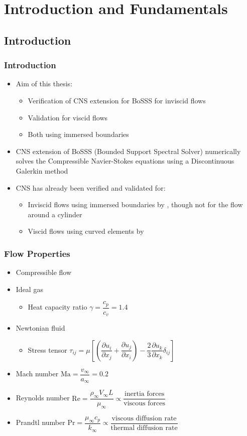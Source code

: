 \section{Introduction and Fundamentals}
\frame{\tableofcontents[currentsection]}
	\subsection{Introduction}
	\begin{frame}
		\frametitle{Introduction}
		\begin{itemize}
			\item Aim of this thesis:
		\begin{itemize}
			\item Verification of CNS extension for BoSSS for inviscid flows
			\item Validation for viscid flows
			\item Both using immersed boundaries
		\end{itemize}
		\pause
		\item CNS extension of BoSSS (Bounded Support Spectral Solver) numerically solves the Compressible Navier-Stokes equations using a Discontinuous Galerkin method
		\pause
		\item CNS has already been verified and validated for:
		\begin{itemize}
			\item Inviscid flows using immersed boundaries by \cite[Müller 2014]{muller2014}, though not for the flow around a cylinder
			\item Viscid flows using curved elements by \cite[Ayers 2015]{ayers2015}
		\end{itemize}
		\end{itemize}
	\end{frame}
	\begin{frame}
		\frametitle{Flow Properties}
		\begin{itemize}
			\item Compressible flow
			\item Ideal gas 
			\begin{itemize}
				\item Heat capacity ratio $\gamma = \dfrac{c_p}{c_v} = 1.4$
			\end{itemize}
			\item Newtonian fluid
			\begin{itemize}
				\item Stress tensor $\tau_{ij} = \mu \left[\left(\dfrac{\partial u_i}{\partial x_j} + \dfrac{\partial u_j}{\partial x_i}\right)- \dfrac{2}{3}\dfrac{\partial u_k}{\partial x_k} \delta_{ij}\right]$
			\end{itemize}
			\item Mach number $\text{Ma} = \dfrac{v_\infty}{a_\infty} = 0.2$
			\item Reynolds number $\text{Re} = \dfrac{\rho_\infty V_\infty L}{\mu_\infty} \propto \dfrac{\text{inertia forces}}{\text{viscous forces}}$
			\item Prandtl number $\text{Pr} = \dfrac{ \mu_\infty c_p}{k_\infty} \propto \dfrac{\text{viscous diffusion rate}}{\text{thermal diffusion rate}}$
		\end{itemize}
	\end{frame}
